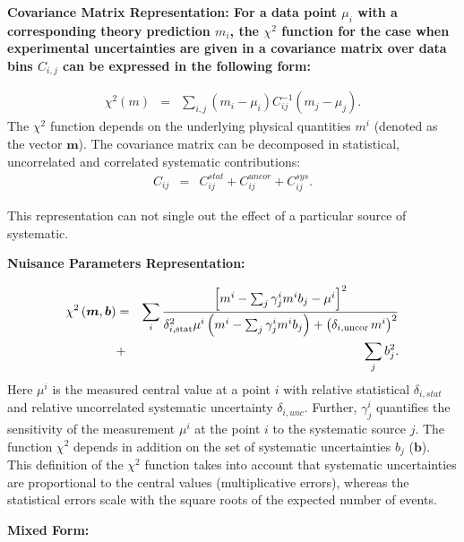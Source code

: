 \begin{description}
\item \bf {Covariance Matrix Representation:} \rm
For a data point  $\mu_i$ with a corresponding theory prediction $m_i$, the $\chi^2$ function for the case when experimental uncertainties are given in a covariance matrix over data bins $C_{i,j}$ can be expressed in the following form:

\begin{eqnarray}
\chi^2 (m)& = & \sum_{i,j}(m_i-\mu_i)C^{-1}_{ij}(m_j-\mu_j).
\end{eqnarray}
The $\chi^2$ function depends on the underlying physical quantities $m^i$ 
(denoted as the vector $\boldsymbol{m}$).
The covariance matrix can be decomposed in statistical, uncorrelated and correlated systematic contributions: 
\begin{eqnarray}
C_{ij}& = & C^{stat}_{ij}+C^{uncor}_{ij}+C^{sys}_{ij}.
\end{eqnarray}

This representation can not single out the effect of a particular
source of systematic.

\item \bf{Nuisance Parameters Representation:} \rm


\begin{eqnarray} 
    \chi^2\left(\boldsymbol{m},\boldsymbol{b}\right) &= &  
 \sum_i \frac{\left[m^i - \sum_j \gamma^i_j m^i b_j  - {\mu^i} \right]^2}
{ \textstyle \delta^2_{i,{\rm stat}}\mu^i \left(m^i -  \sum_j \gamma^i_j m^i b_j\right)
  + \left(\delta_{i,{\rm uncor}}\,  m^i\right)^2} \nonumber \\
  &+& \sum_j b^2_j.
\label{eq:aven}
\end{eqnarray}
%
Here ${\mu^i}$ is the  measured central value  at a point $i$ 
with  relative statistical $\delta_{i,stat}$ 
and relative uncorrelated systematic uncertainty $\delta_{i,unc}$.
Further, 
$\gamma^i_j$ 
quantifies the sensitivity of the
measurement ${\mu^i}$ at the point $i$ to the systematic source $j$. 
The function $\chi^2$ depends in addition on
 the set of systematic uncertainties $b_j$ ($\boldsymbol{b}$).
This definition of the $\chi^2$ function takes into account that
systematic uncertainties are proportional to the central values 
(multiplicative errors), whereas the statistical errors scale 
with the square roots of the expected number of events. 
\item  \bf{Mixed Form:}\rm


\end{description}
